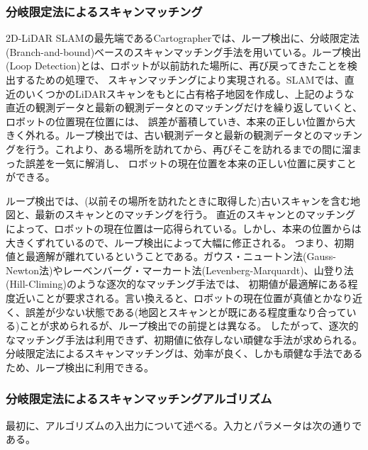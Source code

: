 \subsubsection{分岐限定法によるスキャンマッチング}
2D-LiDAR SLAMの最先端であるCartographerでは、ループ検出に、分岐限定法(Branch-and-bound)ベースのスキャンマッチング手法を用いている。ループ検出(Loop Detection)とは、ロボットが以前訪れた場所に、再び戻ってきたことを検出するための処理で、
スキャンマッチングにより実現される。SLAMでは、直近のいくつかのLiDARスキャンをもとに占有格子地図を作成し、上記のような直近の観測データと最新の観測データとのマッチングだけを繰り返していくと、ロボットの位置現在位置には、
誤差が蓄積していき、本来の正しい位置から大きく外れる。ループ検出では、古い観測データと最新の観測データとのマッチングを行う。これより、ある場所を訪れてから、再びそこを訪れるまでの間に溜まった誤差を一気に解消し、
ロボットの現在位置を本来の正しい位置に戻すことができる。

ループ検出では、(以前その場所を訪れたときに取得した)古いスキャンを含む地図と、最新のスキャンとのマッチングを行う。
直近のスキャンとのマッチングによって、ロボットの現在位置は一応得られている。しかし、本来の位置からは大きくずれているので、ループ検出によって大幅に修正される。
つまり、初期値と最適解が離れているということである。ガウス・ニュートン法(Gauss-Newton法)やレーベンバーグ・マーカート法(Levenberg-Marquardt)、山登り法(Hill-Climing)のような逐次的なマッチング手法では、
初期値が最適解にある程度近いことが要求される。言い換えると、ロボットの現在位置が真値とかなり近く、誤差が少ない状態である(地図とスキャンとが既にある程度重なり合っている)ことが求められるが、ループ検出での前提とは異なる。
したがって、逐次的なマッチング手法は利用できず、初期値に依存しない頑健な手法が求められる。分岐限定法によるスキャンマッチングは、効率が良く、しかも頑健な手法であるため、ループ検出に利用できる。

\subsubsection{分岐限定法によるスキャンマッチングアルゴリズム}
最初に、アルゴリズムの入出力について述べる。入力とパラメータは次の通りである。

